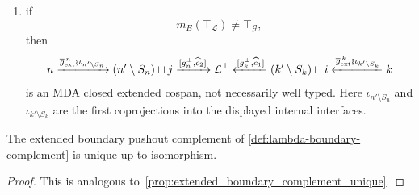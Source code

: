 \begin{definition}
\begin{enumerate}
  \item if
  \[
    m_E(\top_{\mathcal L})\neq\top_{\mathcal G},
  \]
  then
  \[
    n
    \xrightarrow{
      \overline g_{\mathrm{ext}}^{\,n}
      \fatsemi\iota_{n'\setminus S_n}
    }
    (n'\setminus S_n) \coprod j
    \xrightarrow{
      [g_n^\bot,\widehat c_2]
    }
    \mathcal L^\bot
    \xleftarrow{
      [g_k^\bot,\widehat c_1]
    }
    (k'\setminus S_k) \coprod i
    \xleftarrow{
      \overline g_{\mathrm{ext}}^{\,k}
      \fatsemi\iota_{k'\setminus S_k}
    }
    k
  \]
  is an MDA closed extended cospan, not necessarily well typed. Here
  \(\iota_{n'\setminus S_n}\) and
  \(\iota_{k'\setminus S_k}\) are the first coprojections into the
  displayed internal interfaces.
\end{enumerate}
\end{definition}

\begin{proposition}
\label{prop:lambda-boundary-complement-unique}
The extended boundary pushout complement of \cref{def:lambda-boundary-complement} is unique up to isomorphism.
\end{proposition}
\begin{proof}
This is analogous to~\cref{prop:extended_boundary_complement_unique}.
\end{proof}

